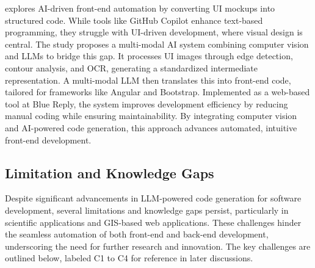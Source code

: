 \citet{manuardi2024images} explores AI-driven front-end automation by converting UI mockups into structured code. While tools like GitHub Copilot enhance text-based programming, they struggle with UI-driven development, where visual design is central. The study proposes a multi-modal AI system combining computer vision and LLMs to bridge this gap. It processes UI images through edge detection, contour analysis, and OCR, generating a standardized intermediate representation. A multi-modal LLM then translates this into front-end code, tailored for frameworks like Angular and Bootstrap. Implemented as a web-based tool at Blue Reply, the system improves development efficiency by reducing manual coding while ensuring maintainability. By integrating computer vision and AI-powered code generation, this approach advances automated, intuitive front-end development.

\subsection{Limitation and Knowledge Gaps}
Despite significant advancements in LLM-powered code generation for software development, several limitations and knowledge gaps persist, particularly in scientific applications and GIS-based web applications. These challenges hinder the seamless automation of both front-end and back-end development, underscoring the need for further research and innovation. The key challenges are outlined below, labeled C1 to C4 for reference in later discussions.

